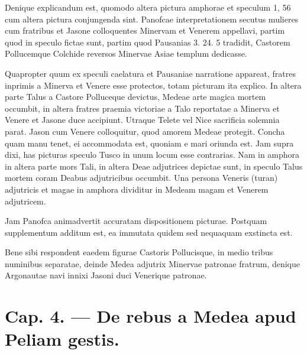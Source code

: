 \documentclass[landscape, a4paper, 11pt, oneside, polutonikogreek, german]{article}
\begin{document}
Denique explicandum est, quomodo altera pictura amphorae et speculum 1, 56 cum altera pictura conjungenda sint. Panofcae interpretationem secutus mulieres cum fratribus et Jasone colloquentes Minervam et Venerem appellavi, partim quod in speculo fictae sunt, partim quod Pausanias 3. 24. 5 tradidit, Castorem Pollucemque Colchide reversos Minervae Asiae templum dedicasse.

Quapropter quum ex speculi caelatura et Pausaniae narratione appareat, fratres inprimis a Minerva et Venere esse protectos, totam picturam ita explico. In altera parte Talus a Castore Polluceque devictus, Medeae arte magica mortem occumbit, in altera fratres praemia victoriae a Talo reportatae a Minerva et Venere et Jasone duce accipiunt. Utraque Telete vel Nice sacrificia solemnia parat. Jason cum Venere colloquitur, quod amorem Medeae protegit. Concha quam manu tenet, ei accommodata est, quoniam e mari oriunda est. Jam supra dixi, has picturas speculo Tusco in unum locum esse contrarias. Nam in amphora in altera parte mors Tali, in altera Deae adjutrices depictae sunt, in speculo Talus mortem coram Deabus adjutricibus occumbit. Una persona Veneris (turan) adjutricis et magae in amphora dividitur in Medeam magam et Venerem adjutricem.

Jam Panofca animadvertit accuratam dispositionem picturae. Postquam supplementum additum est, ea immutata quidem sed nequaquam exstincta est.

Bene sibi respondent eaedem figurae Castoris Pollucisque, in medio tribus numinibus separatae, deinde Medea adjutrix Minervae patronae fratrum, denique Argonautae navi innixi Jasoni duci Venerique patronae.
\clearpage
\section{Cap. 4. --- De rebus a Medea apud Peliam gestis.}
\end{document}
